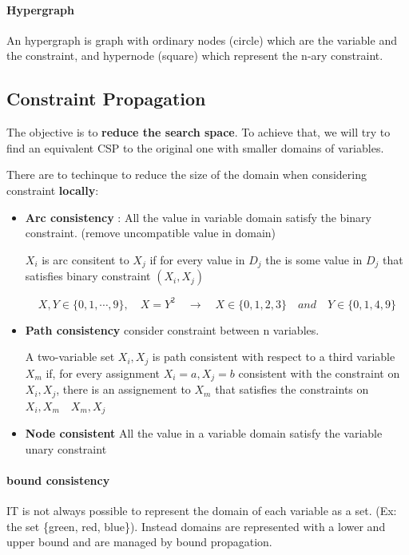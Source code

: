  \paragraph{Hypergraph}   An   hypergraph   is   graph   with   ordinary
 nodes (circle)  which   are  the   variable  and  the   constraint,  and
 hypernode (square) which represent the n-ary constraint.

\subsection{Constraint Propagation}

The objective  is to \textbf{reduce the  search space}. To achieve  that, we will
try to find  an equivalent CSP to the original  one with smaller domains
of variables.

There are to techinque to reduce the size of the domain when considering
constraint \textbf{locally}:
\begin{itemize}
    \item  \textbf{Arc  consistency}  : All the value in variable domain satisfy
        the binary constraint.
      (remove uncompatible value in domain)

$X_i$ is arc consitent to $X_j$ if for every value in $D_j$ the is some value in $D_j$ that satisfies binary constraint $(X_i,X_j)$

      $$ X, Y \in \{0,1,\cdots,9\},\quad X=Y^2 \quad \to \quad X \in \{0,1,2,3\} \quad and \quad Y \in \{0,1,4,9\} $$
  \item \textbf{Path consistency} consider constraint between n variables.

        A  two-variable set  ${X_i,X_j}$ is  path consistent  with respect  to a
        third variable $X_m$ if, for every assignment ${X_i=a,X_j=b}$ consistent
        with the  constraint on  ${X_i,X_j}$, there is  an assignement  to $X_m$
        that satisfies the constraints on ${X_i,X_m}\quad{X_m,X_j}$

  \item \textbf{Node consistent} All  the value in a  variable domain satisfy the variable unary constraint
\end{itemize}


\paragraph{bound consistency} IT is not always possible to represent the
domain of  each variable as  a set. (Ex:  the set \{green,  red, blue\}).
Instead domains  are represented with  a lower  and upper bound  and are
managed by bound propagation.

